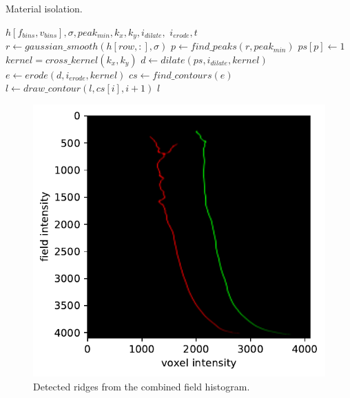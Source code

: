 \begin{algorithm}
    \caption{Material isolation.}
    \label{alg:material}
    \begin{algorithmic}
         {$h[f_{bins},v_{bins}],\sigma, peak_{min}, k_x, k_y, i_{dilate},$ \newline $i_{erode}, t$}
                \State $r \gets gaussian\_smooth(h[row,:], \sigma)$
                \State $p \gets find\_peaks(r, peak_{min})$
                \State $ps[p] \gets 1$
            \EndFor
            \State $kernel = cross\_kernel(k_x, k_y)$
            \State $d \gets dilate(ps, i_{dilate}, kernel)$
            \State $e \gets erode(d, i_{erode}, kernel)$
            \State $cs \gets find\_contours(e)$
                    \State $l \gets draw\_contour(l, cs[i], i+1)$
                \EndIf
            \EndFor
            \Return $l$
        \EndFunction
    \end{algorithmic}
\end{algorithm}

\begin{figure}
    \includegraphics[width=\linewidth]{figures/ridges_gauss+edt-bone_region3.pdf}
    \caption{Detected ridges from the combined field histogram.}
    \label{fig:curves}
\end{figure}

